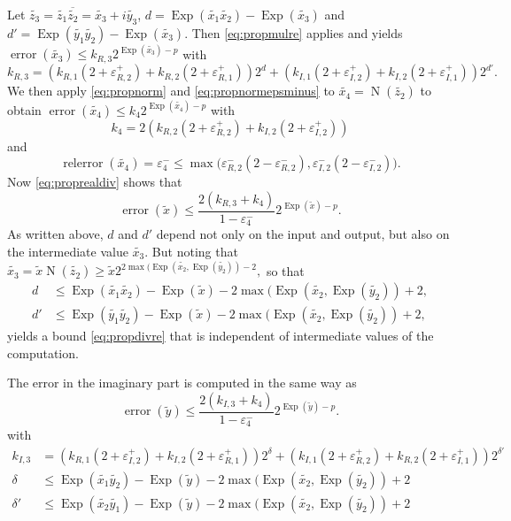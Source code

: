 \documentclass [12pt]{article}
\newcommand {\appro}[1]{\widetilde {#1}}
\DeclareMathOperator{\Exp}{\operatorname {Exp}}
\newcommand{\error}{\operatorname {error}}
\newcommand{\relerror}{\operatorname {relerror}}
\newcommand{\Norm}{\operatorname {N}}
\renewcommand {\epsilon}{\varepsilon}
\renewcommand {\leq}{\leqslant}
\renewcommand {\geq}{\geqslant}
\begin{document}
Let $\appro {z_3} = \appro {z_1} \overline {\appro {z_2}}
= \appro {x_3} + i \appro {y_3}$,
$d = \Exp (\appro {x_1} \appro {x_2}) - \Exp (\appro {x_3})$
and $d' = \Exp (\appro {y_1} \appro {y_2}) - \Exp (\appro {x_3})$.
Then \eqref {eq:propmulre} applies and yields
$\error (\appro {x_3}) \leq k_{R, 3} 2^{\Exp (\appro {x_3}) - p}$
with
\[
k_{R, 3} = \left( k_{R, 1} (2 + \epsilon_{R, 2}^+)
   + k_{R, 2} (2 + \epsilon_{R, 1}^+) \right) 2^d
   + \left( k_{I, 1} (2 + \epsilon_{I, 2}^+)
   + k_{I, 2} (2 + \epsilon_{I, 1}^+) \right) 2^{d'}.
\]
We then apply \eqref {eq:propnorm} and \eqref {eq:propnormepsminus}
to $\appro {x_4} = \Norm (\appro {z_2})$ to  obtain
$\error (\appro {x_4}) \leq k_4 2^{\Exp (\appro {x_4}) - p}$ with
\[
k_4 =   2 \left(
       k_{R, 2} (2 + \epsilon_{R, 2}^+)
     + k_{I, 2} (2 + \epsilon_{I, 2}^+)
\right)
\]
and
\[
\relerror (\appro {x_4}) = \epsilon_4^-
\leq
\max \big(
   \epsilon_{R, 2}^- (2 - \epsilon_{R, 2}^-),
   \epsilon_{I, 2}^- (2 - \epsilon_{I, 2}^-)
\big).
\]
Now \eqref {eq:proprealdiv} shows that
\begin {equation}
\label {eq:propdivre}
\error (\appro x)
\leq
\frac {2 (k_{R, 3} + k_4)}{1 - \epsilon_4^-} 2^{\Exp (\appro x) - p}.
\end {equation}
As written above, $d$ and $d'$ depend not only on the input and output, but
also on the intermediate value $\appro {x_3}$. But noting that
$
\appro {x_3} = \appro x \Norm (\appro {z_2})
\geq
\appro x 2^{2 \max (\Exp (\appro {x_2}, \Exp (\appro {y_2})) - 2},
$
so that
\begin {align*}
d &\leq
\Exp (\appro {x_1} \appro {x_2}) - \Exp (\appro x)
- 2 \max (\Exp (\appro {x_2}, \Exp (\appro {y_2})) + 2, \\
d' &\leq
\Exp (\appro {y_1} \appro {y_2}) - \Exp (\appro x)
- 2 \max (\Exp (\appro {x_2}, \Exp (\appro {y_2})) + 2,
\end {align*}
yields a bound \eqref {eq:propdivre} that is independent of
intermediate values of the computation.

The error in the imaginary part is computed in the same way as
\begin {equation}
\label {eq:propdivim}
\error (\appro y)
\leq
\frac {2 (k_{I, 3} + k_4)}{1 - \epsilon_4^-} 2^{\Exp (\appro y) - p}.
\end {equation}
with
\begin {align*}
k_{I, 3}
&= \left( k_{R, 1} (2 + \epsilon_{I, 2}^+)
   + k_{I, 2} (2 + \epsilon_{R, 1}^+) \right) 2^\delta
   + \left( k_{I, 1} (2 + \epsilon_{R, 2}^+)
   + k_{R, 2} (2 + \epsilon_{I, 1}^+) \right) 2^{\delta'} \\
\delta &\leq
\Exp (\appro {x_1} \appro {y_2}) - \Exp (\appro y)
- 2 \max (\Exp (\appro {x_2}, \Exp (\appro {y_2})) + 2 \\
\delta' &\leq
\Exp (\appro {x_2} \appro {y_1}) - \Exp (\appro y)
- 2 \max (\Exp (\appro {x_2}, \Exp (\appro {y_2})) + 2
\end {align*}
\end{document}
